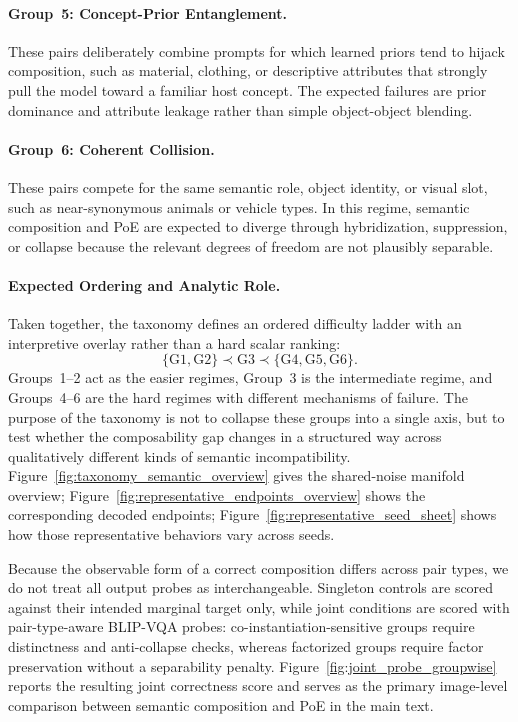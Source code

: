 \documentclass{article}
\begin{document}
\paragraph{Group~5: Concept-Prior Entanglement.}
These pairs deliberately combine prompts for which learned priors tend to hijack composition, such as material, clothing, or descriptive attributes that strongly pull the model toward a familiar host concept. The expected failures are prior dominance and attribute leakage rather than simple object-object blending.

\paragraph{Group~6: Coherent Collision.}
These pairs compete for the same semantic role, object identity, or visual slot, such as near-synonymous animals or vehicle types. In this regime, semantic composition and PoE are expected to diverge through hybridization, suppression, or collapse because the relevant degrees of freedom are not plausibly separable.

\paragraph{Expected Ordering and Analytic Role.}
Taken together, the taxonomy defines an ordered difficulty ladder with an interpretive overlay rather than a hard scalar ranking:
\[
\{ \text{G1}, \text{G2} \} \prec \text{G3} \prec \{ \text{G4}, \text{G5}, \text{G6} \}.
\]
Groups~1--2 act as the easier regimes, Group~3 is the intermediate regime, and Groups~4--6 are the hard regimes with different mechanisms of failure. The purpose of the taxonomy is not to collapse these groups into a single axis, but to test whether the composability gap changes in a structured way across qualitatively different kinds of semantic incompatibility. Figure~\ref{fig:taxonomy_semantic_overview} gives the shared-noise manifold overview; Figure~\ref{fig:representative_endpoints_overview} shows the corresponding decoded endpoints; Figure~\ref{fig:representative_seed_sheet} shows how those representative behaviors vary across seeds.

Because the observable form of a correct composition differs across pair types, we do
not treat all output probes as interchangeable. Singleton controls are scored against
their intended marginal target only, while joint conditions are scored with
pair-type-aware BLIP-VQA probes: co-instantiation-sensitive groups require distinctness
and anti-collapse checks, whereas factorized groups require factor preservation without a
separability penalty. Figure~\ref{fig:joint_probe_groupwise} reports the resulting joint
correctness score and serves as the primary image-level comparison between semantic
composition and PoE in the main text.
\end{document}
